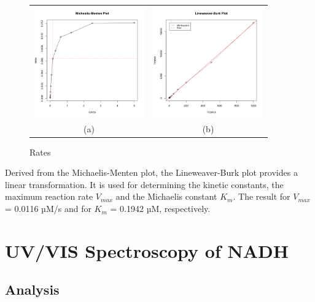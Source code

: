 \documentclass[a4paper,11pt]{article}
\begin{document}
                \begin{figure}[H]
                    \centering
                    \begin{tabular}{cc}
                        \includegraphics[width=180px]{../resources/kinetics_mmplot.png} &
                        \includegraphics[width=180px]{../resources/kinetics_lbplot.png} \\
                        (a) & (b)\\
                    \end{tabular}
                    \caption{Rates}\label{fig:mm_plot}
                \end{figure}

                Derived from the Michaelis-Menten plot, the Lineweaver-Burk plot provides a linear 
                transformation. It is used for determining the kinetic constants, the maximum reaction 
                rate $V_{max}$ and the Michaelis constant $K_m$. The result for $V_{max}$ = 0.0116 µM/s and for 
                $K_m$ = 0.1942 µM, respectively.

    \pagebreak

    \section{UV/VIS Spectroscopy of NADH}
    
        \subsection*{Analysis}
        
    \pagebreak
\end{document}
